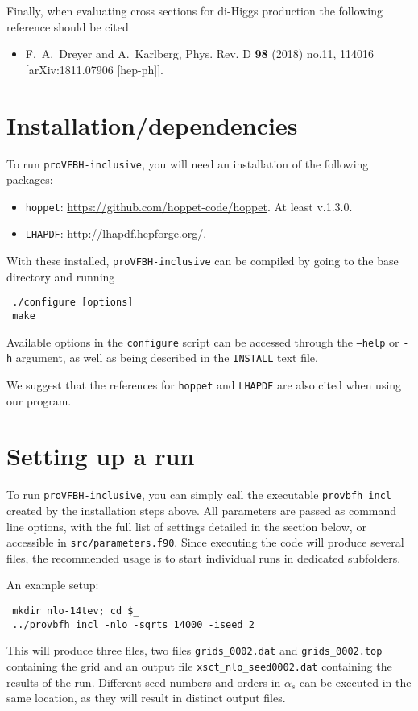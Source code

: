 \documentclass[12pt,a4]{article}
\newcommand{\provbfhincl}{\texttt{proVFBH-inclusive}\xspace}
\begin{document}
Finally, when evaluating cross sections for di-Higgs production the following reference should be cited
\begin{itemize}
\item F.~A.~Dreyer and A.~Karlberg,
Phys. Rev. D \textbf{98} (2018) no.11, 114016
[arXiv:1811.07906 [hep-ph]].
\end{itemize}
\section{Installation/dependencies}
To run \provbfhincl, you will need an installation of the following packages:
\begin{itemize}
\item \texttt{hoppet}:
  \url{https://github.com/hoppet-code/hoppet}. At least v.1.3.0.
\item \texttt{LHAPDF}: \url{http://lhapdf.hepforge.org/}.
\end{itemize}
With these installed, \provbfhincl can be compiled by going to the base
directory and running
\begin{verbatim}
 ./configure [options]
 make
\end{verbatim}
Available options in the \texttt{configure} script can be accessed
through the \texttt{--help} or \texttt{-h} argument, as well as being
described in the \texttt{INSTALL} text file.

We suggest that the references for \texttt{hoppet} and \texttt{LHAPDF}
are also cited when using our program.

\section{Setting up a run}
To run \provbfhincl, you can simply call the executable
\texttt{provbfh\_incl} created by the installation steps above.
%
All parameters are passed as command line options, with the full list
of settings detailed in the section below, or accessible in
\texttt{src/parameters.f90}.
%
Since executing the code will produce several files, the recommended
usage is to start individual runs in dedicated subfolders.

An example setup:
\begin{verbatim}
 mkdir nlo-14tev; cd $_
 ../provbfh_incl -nlo -sqrts 14000 -iseed 2
\end{verbatim}
This will produce three files, two files \texttt{grids\_0002.dat} and
\texttt{grids\_0002.top} containing the grid and an output file
\texttt{xsct\_nlo\_seed0002.dat} containing the results of the run.
%
Different seed numbers and orders in
$\alpha_s$ can be executed in the same location, as they will result
in distinct output files.
\end{document}

